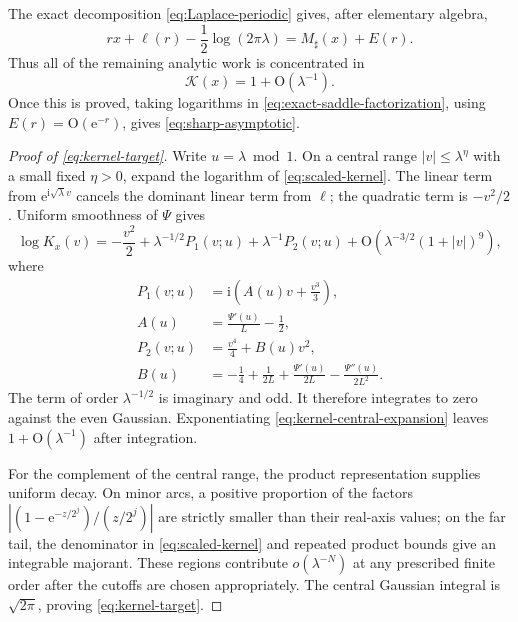 \documentclass[11pt]{article}
\numberwithin{equation}{section}
\theoremstyle{definition}
\theoremstyle{remark}
\newcommand{\e}{\mathrm e}
\newcommand{\ii}{\mathrm i}
\newcommand{\Oh}{\mathrm O}
\begin{document}
The exact decomposition \eqref{eq:Laplace-periodic} gives, after elementary
algebra,
\begin{equation}\label{eq:exact-saddle-action}
 rx+\ell(r)-\frac12\log(2\pi\lambda)
 =M_\sharp(x)+E(r).
\end{equation}
Thus all of the remaining analytic work is concentrated in
\begin{equation}\label{eq:kernel-target}
 \mathcal K(x)=1+\Oh(\lambda^{-1}).
\end{equation}
Once this is proved, taking logarithms in
\eqref{eq:exact-saddle-factorization}, using
$E(r)=\Oh(\e^{-r})$, gives \eqref{eq:sharp-asymptotic}.

\begin{proof}[Proof of \eqref{eq:kernel-target}]
Write $u=\lambda\bmod1$.  On a central range
$|v|\le\lambda^\eta$ with a small fixed $\eta>0$, expand the logarithm of
\eqref{eq:scaled-kernel}.  The linear term from $\e^{\ii\sqrt\lambda v}$
cancels the dominant linear term from $\ell$; the quadratic term is
$-v^2/2$.  Uniform smoothness of $\Psi$ gives
\begin{equation}\label{eq:kernel-central-expansion}
 \log K_x(v)=-\frac{v^2}{2}
 +\lambda^{-1/2}P_1(v;u)
 +\lambda^{-1}P_2(v;u)
 +\Oh\!\left(\lambda^{-3/2}(1+|v|)^9\right),
\end{equation}
where
\begin{align}
 P_1(v;u)&=\ii\left(A(u)v+\frac{v^3}{3}\right),
 \label{eq:P1}\\
 A(u)&=\frac{\Psi'(u)}{L}-\frac12,
 \label{eq:A-Psi}\\
 P_2(v;u)&=\frac{v^4}{4}+B(u)v^2,
 \label{eq:P2}\\
 B(u)&=-\frac14+\frac1{2L}+\frac{\Psi'(u)}{2L}
      -\frac{\Psi''(u)}{2L^2}.
 \label{eq:B-Psi}
\end{align}
The term of order $\lambda^{-1/2}$ is imaginary and odd.  It therefore
integrates to zero against the even Gaussian.  Exponentiating
\eqref{eq:kernel-central-expansion} leaves $1+\Oh(\lambda^{-1})$ after
integration.

For the complement of the central range, the product representation supplies
uniform decay.  On minor arcs, a positive proportion of the factors
$|(1-\e^{-z/2^j})/(z/2^j)|$ are strictly smaller than their real-axis values;
on the far tail, the denominator in \eqref{eq:scaled-kernel} and repeated
product bounds give an integrable majorant.  These regions contribute
$o(\lambda^{-N})$ at any prescribed finite order after the cutoffs are chosen
appropriately.  The central Gaussian integral is $\sqrt{2\pi}$, proving
\eqref{eq:kernel-target}.
\end{proof}
\end{document}
